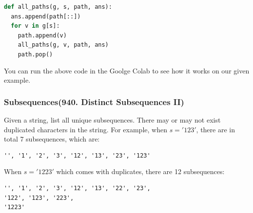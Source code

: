 \documentclass[../main.tex]{subfiles}
\begin{document}
\begin{lstlisting}[language=Python]
def all_paths(g, s, path, ans):
  ans.append(path[::])
  for v in g[s]:
    path.append(v)
    all_paths(g, v, path, ans)
    path.pop()
\end{lstlisting}
You can run the above code in the Goolge Colab to see how it works on our given example.

\subsubsection{Subsequences(940. Distinct Subsequences II)} Given a string, list all unique subsequences. There may or may not exist duplicated characters in the string. For example, when $s='123'$, there are in total 7 subsequences, which are:
\begin{lstlisting}[numbers=none]
'', '1', '2', '3', '12', '13', '23', '123'
\end{lstlisting}
When $s='1223'$ which comes with duplicates, there are 12 subsequences:
\begin{lstlisting}[numbers=none]
'', '1', '2', '3', '12', '13', '22', '23', 
'122', '123', '223',
'1223'
\end{lstlisting}
\end{document}
